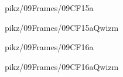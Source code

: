 \documentclass[9pt,xcolor={svgnames, x11names}]{beamer}
\begin{document}

\begin{frame}{pikz/09Frames/09CF15a}
  
\end{frame}


\begin{frame}{pikz/09Frames/09CF15aQwizm}
  
\end{frame}


\begin{frame}{pikz/09Frames/09CF16a}
  
\end{frame}


\begin{frame}{pikz/09Frames/09CF16aQwizm}
  
\end{frame}





\end{document}
